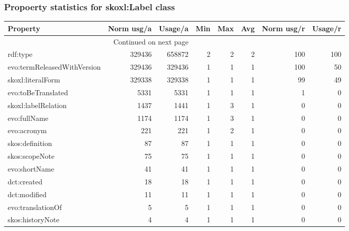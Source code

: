\documentclass[10pt,a4paper,titlepage,final]{article}
\begin{document}
\subsubsection{Propoerty statistics for skoxl:Label class}
\begin{longtable}{lrrrrrrr}
\toprule
                    Property &  Norm usg/a &  Usage/a &  Min &  Max &  Avg &  Norm usg/r &  Usage/r \\
\midrule
\endhead
\midrule
\multicolumn{3}{r}{{Continued on next page}} \\
\midrule
\endfoot

\bottomrule
\endlastfoot
                    rdf:type &      329436 &   658872 &    2 &    2 &    2 &         100 &      100 \\
 evo:termReleasedWithVersion &      329436 &   329436 &    1 &    1 &    1 &         100 &       50 \\
           skoxl:literalForm &      329338 &   329338 &    1 &    1 &    1 &          99 &       49 \\
          evo:toBeTranslated &        5331 &     5331 &    1 &    1 &    1 &           1 &        0 \\
         skoxl:labelRelation &        1437 &     1441 &    1 &    3 &    1 &           0 &        0 \\
                evo:fullName &        1174 &     1174 &    1 &    3 &    1 &           0 &        0 \\
                 evo:acronym &         221 &      221 &    1 &    2 &    1 &           0 &        0 \\
             skos:definition &          87 &       87 &    1 &    1 &    1 &           0 &        0 \\
              skos:scopeNote &          75 &       75 &    1 &    1 &    1 &           0 &        0 \\
               evo:shortName &          41 &       41 &    1 &    1 &    1 &           0 &        0 \\
                 dct:created &          18 &       18 &    1 &    1 &    1 &           0 &        0 \\
                dct:modified &          11 &       11 &    1 &    1 &    1 &           0 &        0 \\
           evo:translationOf &           5 &        5 &    1 &    1 &    1 &           0 &        0 \\
            skos:historyNote &           4 &        4 &    1 &    1 &    1 &           0 &        0 \\
\end{longtable}
\end{document}
